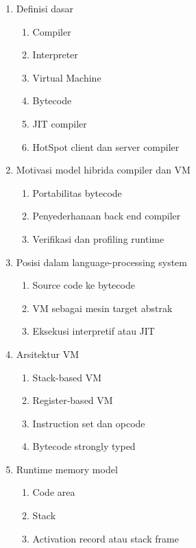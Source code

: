 \begin{enumerate}
    \item \pwajib Definisi dasar
    \begin{enumerate}
        \item \pwajib Compiler
        \item \pwajib Interpreter
        \item \pwajib Virtual Machine
        \item \pwajib Bytecode
        \item \pwajib JIT compiler
        \item \ppaham HotSpot client dan server compiler
    \end{enumerate}
    \item \pwajib Motivasi model hibrida compiler dan VM
    \begin{enumerate}
        \item \pwajib Portabilitas bytecode
        \item \pwajib Penyederhanaan back end compiler
        \item \ppaham Verifikasi dan profiling runtime
    \end{enumerate}
    \item \pwajib Posisi dalam language-processing system
    \begin{enumerate}
        \item \pwajib Source code ke bytecode
        \item \pwajib VM sebagai mesin target abstrak
        \item \pwajib Eksekusi interpretif atau JIT
    \end{enumerate}
    \item \pwajib Arsitektur VM
    \begin{enumerate}
        \item \pwajib Stack-based VM
        \item \ppaham Register-based VM
        \item \pwajib Instruction set dan opcode
        \item \pwajib Bytecode strongly typed
    \end{enumerate}
    \item \pwajib Runtime memory model
    \begin{enumerate}
        \item \pwajib Code area
        \item \pwajib Stack
        \item \pwajib Activation record atau stack frame

\end{enumerate}
\end{enumerate}
